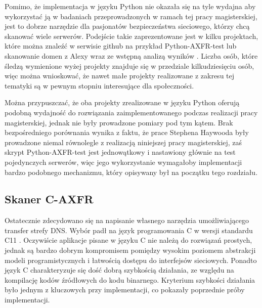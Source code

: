 Pomimo, że implementacja w języku Python nie okazała się na tyle wydajna aby wykorzystać ją w badaniach przeprowadzonych w
ramach tej pracy magisterskiej, jest to dobrze narzędzie dla pasjonatów bezpieczeństwa sieciowego, którzy chcą skanować wiele
serwerów. Podejście takie zaprezentowane jest w kilku projektach, które można znaleźć w serwisie github na przykład
Python-AXFR-test \cite{python_axfr_test} lub skanowanie domen z Alexy wraz ze wstępną analizą wyników \cite{asg-axfr}. Liczba osób,
które śledzą wymienione wyżej projekty znajduje się w przedziale kilkudziesięciu osób, więc można wnioskować, że nawet małe
projekty realizowane z zakresu tej tematyki są w pewnym stopniu interesujące dla społeczności.

Można przypuszczać, że oba projekty zrealizowane w języku Python \cite{python_axfr_test, asg-axfr} oferują podobną wydajność do
rozwiązania zaimplementowanego podczas realizacji pracy magisterskiej, jednak nie były prowadzone pomiary pod tym kątem. Brak
bezpośredniego porównania wynika z faktu, że prace Stephena Haywooda \cite{asg-axfr} były prowadzone niemal równolegle z realizacją
niniejszej pracy magisterskiej, zaś skrypt Python-AXFR-test \cite{python_axfr_test} jest jednowątkowy i nastawiony głównie na test
pojedynczych serwerów, więc jego wykorzystanie wymagałoby implementacji bardzo podobnego mechanizmu, który opisywany był na
początku tego rozdziału.

\subsection{Skaner C-AXFR}
\noindent Ostatecznie zdecydowano się na napisanie własnego narzędzia umożliwiającego transfer strefy DNS. Wybór padł na język
programowania C \cite{Kernighan:1988:CPL:576122} w wersji standardu C11 \cite{ISO9899}. Oczywiście aplikacje pisane w języku
C nie należą do rozwiązań prostych, jednak są bardzo dobrym kompromisem pomiędzy wysokim poziomem abstrakcji modeli programistycznych
i łatwością dostępu do interfejsów sieciowych. Ponadto język C charakteryzuje się dość dobrą szybkością działania, ze względu na
kompilację kodów źródłowych do kodu binarnego. Kryterium szybkości działania było jednym z kluczowych przy implementacji, co
pokazały poprzednie próby implementacji.

